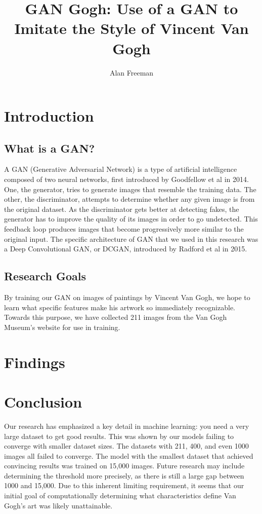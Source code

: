 \documentclass[12pt,letterpaper]{article}
\author{Alan Freeman}
\title{GAN Gogh: Use of a GAN to Imitate the Style of Vincent Van Gogh}
\begin{document}
	\maketitle
	\section{Introduction}
	\subsection{What is a GAN?}
	A GAN (Generative Adversarial Network) is a type of artificial intelligence composed of two neural networks, first introduced by Goodfellow et al in 2014.\cite{NIPS2014_5ca3e9b1}
	One, the generator, tries to generate images that resemble the training data.
	The other, the discriminator, attempts to determine whether any given image is from the original dataset.
	As the discriminator gets better at detecting fakes, the generator has to improve the quality of its images in order to go undetected.
	This feedback loop produces images that become progressively more similar to the original input.
	The specific architecture of GAN that we used in this research was a Deep Convolutional GAN, or DCGAN, introduced by Radford et al in 2015.\cite{radford2015unsupervised}
	\subsection{Research Goals}
	By training our GAN on images of paintings by Vincent Van Gogh, we hope to learn what specific features make his artwork so immediately recognizable.
	Towards this purpose, we have collected 211 images from the Van Gogh Museum's website for use in training.

	\section{Findings}


	\section{Conclusion}
	Our research has emphasized a key detail in machine learning: you need a very large dataset to get good results.
	This was shown by our models failing to converge with smaller dataset sizes.
	The datasets with 211, 400, and even 1000 images all failed to converge.
	The model with the smallest dataset that achieved convincing results was trained on 15,000 images.
	Future research may include determining the threshold more precisely, as there is still a large gap between 1000 and 15,000.
	Due to this inherent limiting requirement, it seems that our initial goal of computationally determining what characteristics define Van Gogh's art was likely unattainable.
\end{document}
